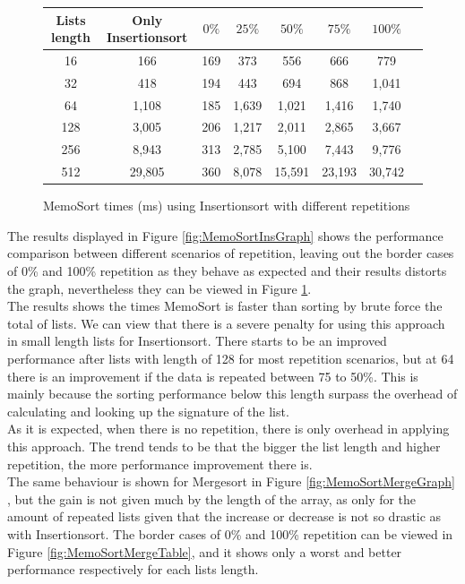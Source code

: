 \documentclass[a4paper,12pt]{article}
\begin{document}
\begin{figure}[H]
\centering
\begin{tabular}{|c|c|c|c|c|c|c|c|}  \toprule
	{Lists length} & {Only Insertionsort} & {$0\%$} & {$25\%$} & {$50\%$} & {$75\%$} & {$100\%$} \\ \midrule
	16 &166&169&373 & 556 & 666 & 779\\ 
	32 &418&194&443 & 694& 868& 1,041\\ 
	64 &1,108&185 &1,639&1,021&1,416& 1,740\\ 
	128 &3,005&206&1,217&2,011&2,865 &3,667\\ 
	256 &8,943&313&2,785 &5,100&7,443&9,776\\ 
	512 &29,805 & 360&8,078 &15,591 &23,193 &30,742\\ \bottomrule
\end{tabular}
\caption{MemoSort times (ms) using Insertionsort with different repetitions}
\label{fig:MemoSortInsTable}
\end{figure}

The results displayed in Figure \ref{fig:MemoSortInsGraph} shows the performance comparison between different scenarios of repetition, leaving out the border cases of 0\% and 100\% repetition as they behave as expected and their results distorts the graph, nevertheless they can be viewed in Figure \ref{fig:MemoSortInsTable}. \\

The results shows the times MemoSort is faster than sorting by brute force the total of lists. We can view that there is a severe penalty for using this approach in small length lists for Insertionsort. There starts to be an improved performance after lists with length of 128 for most repetition scenarios, but at 64 there is an improvement if the data is repeated between 75 to 50\%. This is  mainly because the sorting performance below this length surpass the overhead of calculating and looking up the signature of the list. \\
As it is expected, when there is no repetition, there is only overhead in applying this approach. The trend tends to be that the bigger the list length and higher repetition, the more performance improvement there is. \\

The same behaviour is shown for Mergesort in Figure  \ref{fig:MemoSortMergeGraph} , but the gain is not given much by the length of the array, as only for the amount of repeated lists given that the increase or decrease is not so drastic as with Insertionsort. The border cases of 0\% and 100\% repetition can be viewed in Figure  \ref{fig:MemoSortMergeTable}, and it shows only a worst and better performance respectively for each lists length.
\end{document}
